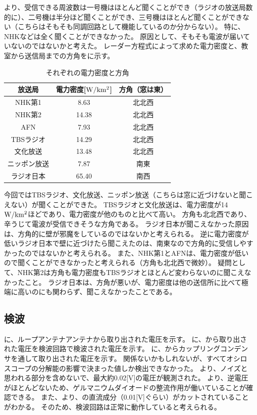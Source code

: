 \documentclass[report.tex]{subfiles}
\begin{document}
より、受信できる周波数は一号機はほとんど聞くことができ（ラジオの放送局数的に）、二号機は半分ほど聞くことができ、三号機はほとんど聞くことができない（こちらはそもそも同調回路として機能しているのか分からない）。
特に、NHKなどは全く聞くことができなかった。
原因として、そもそも電波が届いていないのではないかと考えた。
レーダー方程式によって求めた電力密度と、教室から送信局までの方角をに示す。

\begin{table}[H]
	\centering
	\caption{それぞれの電力密度と方角}
	\label{tab:aaa}
	\begin{tabular}{ccc} \hline
		放送局    & 電力密度[\(\rm{W/km^2}\)] & 方角（窓は東） \\ \hline
		NHK第1  & 8.63                  & 北北西     \\
		NHK第2  & 14.38                 & 北北西     \\
		AFN    & 7.93                  & 北北西     \\
		TBSラジオ & 14.29                 & 北北西     \\
		文化放送   & 13.48                 & 北北西     \\
		ニッポン放送 & 7.87                  & 南東      \\
		ラジオ日本  & 65.40                 & 南西      \\ \hline
	\end{tabular}
\end{table}

今回ではTBSラジオ、文化放送、ニッポン放送（こちらは窓に近づけないと聞こえない）が聞くことができた。
TBSラジオと文化放送は、電力密度が14 \(\rm{W/km^2}\)ほどであり、電力密度が他のものと比べて高い。
方角も北北西であり、辛うじて電波が受信できそうな方角である。
ラジオ日本が聞こえなかった原因は、方角的に壁が邪魔をしているのではないかと考えられる。
逆に電力密度が低いラジオ日本で壁に近づけたら聞こえたのは、南東なので方角的に受信しやすかったのではないかと考えられる。
また、NHK第1とAFNは、電力密度が低いので聞くことができなかったと考えられる（方角も北北西で微妙）。
疑問として、NHK第2は方角も電力密度もTBSラジオとほとんど変わらないのに聞こえなかったこと。
ラジオ日本は、方角が悪いが、電力密度は他の送信所に比べて極端に高いのにも関わらず、聞こえなかったことである。

\subsection{検波}

に、ループアンテナアンテナから取り出された電圧を示す。
に、から取り出された電圧を検波回路で検波された電圧を示す。
に、からカップリングコンデンサを通して取り出された電圧を示す。
関係ないかもしれないが、すべてオシロスコープの分解能の影響で決まった値しか検出できなかった。
より、ノイズと思われる部分を含めないで、最大約0.02[V]の電圧が観測された。
より、逆電圧がほとんどないため、ゲルマニウムダイオードの整流作用が働いていることが確認できる。
また、より、の直流成分（0.01[V]ぐらい）がカットされていることがわかる。
そのため、検波回路は正常に動作していると考えられる。
\end{document}
